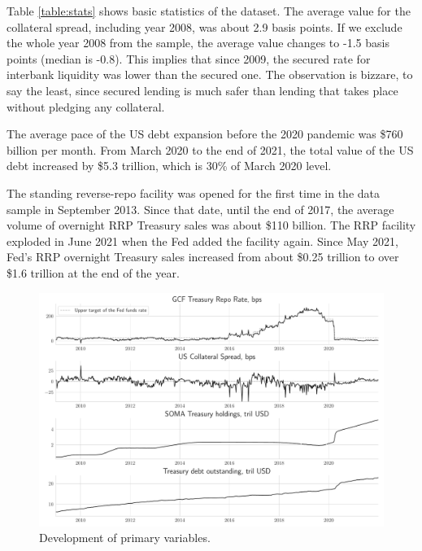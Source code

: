 \documentclass[11pt,a4paper,english,oneside]{article}
\begin{document}
Table \ref{table:stats} shows basic statistics of the dataset. The average value for the collateral spread, including year 2008, was about 2.9 basis points. If we exclude the whole year 2008 from the sample, the average value changes to -1.5 basis points (median is -0.8). This implies that since 2009, the secured rate for interbank liquidity was lower than the secured one. The observation is bizzare, to say the least, since secured lending is much safer than lending that takes place without pledging any collateral.

The average pace of the US debt expansion before the 2020 pandemic was \$760 billion per month. From March 2020 to the end of 2021, the total value of the US debt increased by \$5.3 trillion, which is 30\% of March 2020 level.

The standing reverse-repo facility was opened for the first time in the data sample in September 2013. Since that date, until the end of 2017, the average volume of overnight RRP Treasury sales was about \$110 billion. The RRP facility exploded in June 2021 when the Fed added the facility again. Since May 2021, Fed's RRP overnight Treasury sales increased from about \$0.25 trillion to over \$1.6 trillion at the end of the year.

\begin{figure}[htb!]
  \begin{center}
    \caption{Development of primary variables.}
    \includegraphics[width=0.99\linewidth]{main_vars.pdf}
  \end{center}
  \label{fig:vars}
\end{figure}
\end{document}
